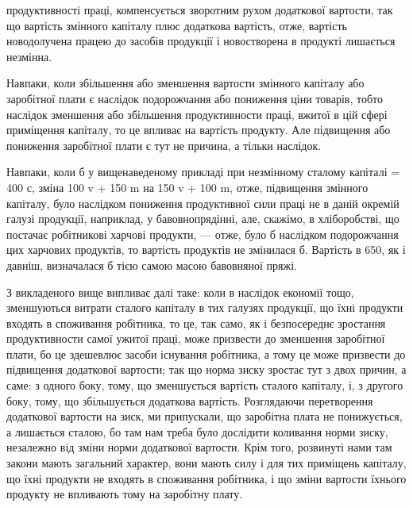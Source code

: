 продуктивності праці, компенсується зворотним рухом додаткової вартости, так що
вартість змінного капіталу плюс додаткова вартість, отже, вартість новодолучена
працею до засобів продукції і новостворена в продукті лишається незмінна.

Навпаки, коли збільшення або зменшення вартости змінного капіталу або
заробітної плати є наслідок подорожчання або пониження ціни товарів, тобто
наслідок зменшення або збільшення продуктивности праці, вжитої в цій сфері
приміщення капіталу, то це впливає на вартість продукту. Але підвищення
або пониження заробітної плати є тут не причина, а тільки наслідок.

Навпаки, коли б у вищенаведеному прикладі при незмінному сталому
капіталі = 400 с, зміна 100 v + 150 m на 150 v + 100 m, отже, підвищення
змінного капіталу, було наслідком пониження продуктивної сили праці не в даній
окремій галузі продукції, наприклад, у бавовнопрядінні, але, скажімо, в хліборобстві,
що постачає робітникові харчові продукти, — отже, було б наслідком
подорожчання цих харчових продуктів, то вартість продуктів не змінилася б.
Вартість в 650, як і давніш, визначалася б тією самою масою бавовняної пряжі.

З викладеного вище випливає далі таке: коли в наслідок економії тощо,
зменшуються витрати сталого капіталу в тих галузях продукції, що їхні продукти
входять в споживання робітника, то це, так само, як і безпосереднє зростання
продуктивности самої ужитої праці, може призвести до зменшення заробітної
плати, бо це здешевлює засоби існування робітника, а тому це може
призвести до підвищення додаткової вартости; так що норма зиску зростає тут
з двох причин, а саме: з одного боку, тому, що зменшується вартість сталого
капіталу, і, з другого боку, тому, що збільшується додаткова вартість. Розглядаючи
перетворення додаткової вартости на зиск, ми припускали, що заробітна
плата не понижується, а лишається сталою, бо там нам треба було дослідити
коливання норми зиску, незалежно від зміни норми додаткової вартости. Крім
того, розвинуті нами там закони мають загальний характер, вони мають силу
і для тих приміщень капіталу, що їхні продукти не входять в споживання робітника,
і що зміни вартости їхнього продукту не впливають тому на заробітну плату.

